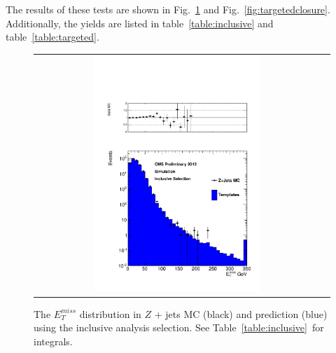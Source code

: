 The results of these tests are shown in Fig.~\ref{fig:inclusiveclosure} and Fig.~\ref{fig:targetedclosure}. Additionally, the yields are listed
in table~\ref{table:inclusive} and table~\ref{table:targeted}.
\begin{figure}[!h]
\begin{center}
\begin{tabular}{cc}
\includegraphics[width=0.6\textwidth]{plots/closure_inclusive.pdf}
\end{tabular}
\caption{The $E^{miss}_T$ distribution in $Z$ + jets MC (black) and prediction (blue) using the inclusive analysis selection. See Table~\ref{table:inclusive}~for integrals.
\label{fig:inclusiveclosure}
}
\end{center}
\end{figure}

